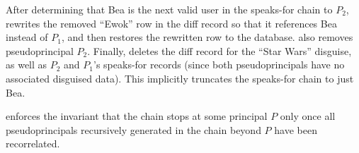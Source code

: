 \begin{enumerate}
%
        After determining that Bea is the next valid user in the speaks-for chain to
        $P_2$, \sys rewrites the removed ``Ewok'' row in the diff record so that
        it references Bea instead of $P_1$, and then restores the rewritten row
        to the database. \sys also removes pseudoprincipal $P_2$.
%
        Finally, \sys deletes the diff record for the ``Star Wars'' disguise, as
        well as
        $P_2$ and $P_1$'s speaks-for records (since both pseudoprincipals 
        have no associated disguised data).
        This implicitly truncates the speaks-for chain to just Bea.
\end{enumerate}
%
\sys enforces the invariant that the chain stops at some principal $P$ only once all pseudoprincipals recursively generated in the chain beyond $P$ have
been recorrelated.
%


%

